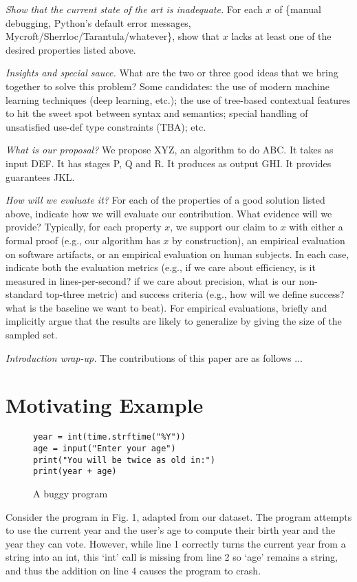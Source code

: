 \documentclass[conference]{IEEEtran}
\begin{document}
\emph{Show that the current state of the art is inadequate.} For each $x$ of
\{manual debugging, Python's default error messages,
Mycroft/Sherrloc/Tarantula/whatever\}, show that $x$ lacks at least one of the
desired properties listed above.

\emph{Insights and special sauce.} What are the two or three good ideas
that we bring together to solve this problem? Some candidates: the use of
modern machine learning techniques (deep learning, etc.); the use of
tree-based contextual features to hit the sweet spot between syntax and semantics;
special handling of unsatisfied use-def type constraints (TBA); etc.

\emph{What is our proposal?} We propose XYZ, an algorithm to do ABC. It
takes as input DEF. It has stages P, Q and R. It produces as output GHI. It
provides guarantees JKL.

\emph{How will we evaluate it?} For each of the properties of a good
solution listed above, indicate how we will evaluate our contribution. What
evidence will we provide? Typically, for each property $x$, we support our
claim to $x$ with either a formal proof (e.g., our algorithm has $x$ by
construction), an empirical evaluation on software artifacts, or an
empirical evaluation on human subjects. In each case, indicate both the
evaluation metrics (e.g., if we care about efficiency, is it measured in
lines-per-second? if we care about precision, what is our non-standard
top-three metric) and success criteria (e.g., how will we define success?
what is the baseline we want to beat). For empirical evaluations, briefly
and implicitly argue that the results are likely to generalize by giving
the size of the sampled set.

\emph{Introduction wrap-up.} The contributions of this paper are as follows
...

\section{Motivating Example}

\begin{figure}
\begin{verbatim}
year = int(time.strftime("%Y"))
age = input("Enter your age")
print("You will be twice as old in:")
print(year + age)
\end{verbatim}
\caption{A buggy program}
\end{figure}

Consider the program in Fig. 1, adapted from our dataset. The program
attempts to use the current year and the user's age to compute their
birth year and the year they can vote. However, while line 1 correctly
turns the current year from a string into an int, this `int' call is
missing from line 2 so `age' remains a string, and thus the addition
on line 4 causes the program to crash.
\end{document}
